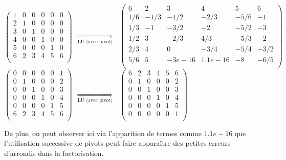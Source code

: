 \documentclass[11pt]{article}
\begin{document}
\begin{center}
    $
    \begin{pmatrix}
       1 & 0 & 0 & 0 & 0 & 0 \\
       2 & 1 & 0 & 0 & 0 & 0 \\
       3 & 0 & 1 & 0 & 0 & 0 \\
       4 & 0 & 0 & 1 & 0 & 0 \\
       5 & 0 & 0 & 0 & 1 & 0 \\
       6 & 2 & 3 & 4 & 5 & 6 \\
    \end{pmatrix}
    ~~
    \underset{\textrm{LU (avec pivot)}}{\Longrightarrow}
    ~~~
    \begin{pmatrix}
       6   & 2    & 3      & 4       & 5    & 6 \\
       1/6 & -1/3 & -1/2   & -2/3    & -5/6 & -1 \\
       1/3 & -1   & -3/2   & -2      & -5/2 & -3 \\
       1/2 & 3    & -2/3   & 4/3     & -5/3 & -2 \\
       2/3 & 4    & 0      & -3/4    & -5/4 & -3/2 \\
       5/6 & 5    & -3e-16 & 1.1e-16 & -8   & -6/5 \\
    \end{pmatrix}
    $ \\
    $
    \begin{pmatrix}
       0 & 0 & 0 & 0 & 0 & 1 \\
       0 & 1 & 0 & 0 & 0 & 2 \\
       0 & 0 & 1 & 0 & 0 & 3 \\
       0 & 0 & 0 & 1 & 0 & 4 \\
       0 & 0 & 0 & 0 & 1 & 5 \\
       6 & 2 & 3 & 4 & 5 & 6 \\
    \end{pmatrix}
    ~~
    \underset{\textrm{LU (avec pivot)}}{\Longrightarrow}
    ~~~
    \begin{pmatrix}
       6 & 2 & 3 & 4 & 5 & 6 \\
       0 & 1 & 0 & 0 & 0 & 2 \\
       0 & 0 & 1 & 0 & 0 & 3 \\
       0 & 0 & 0 & 1 & 0 & 4 \\
       0 & 0 & 0 & 0 & 1 & 5 \\
       0 & 0 & 0 & 0 & 0 & 1 \\
    \end{pmatrix}
    $

\end{center}
De plus, on peut observer ici via l'apparition de termes comme $1.1e-16$ que l'utilisation successive de pivots peut faire apparaître des petites erreurs d'arrondis dans la factorisation.
\end{document}
